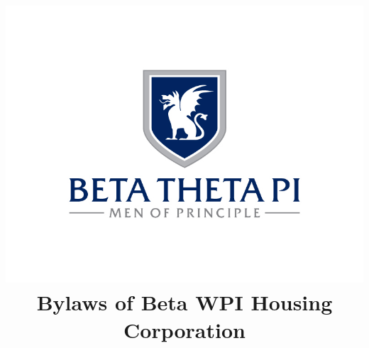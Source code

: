 \documentclass[12pt]{report}
\title{%
    \includegraphics[width=\textwidth]{btp_tone.jpg}\\[1cm] Bylaws of Beta
    WPI Housing Corporation
}
\date{\dateadopted}
\begin{document}


\begin{titlepage}

\maketitle

\end{titlepage}


\setcounter{tocdepth}{1} \tableofcontents \clearpage

\renewcommand\chaptername{Article}







\end{document}
